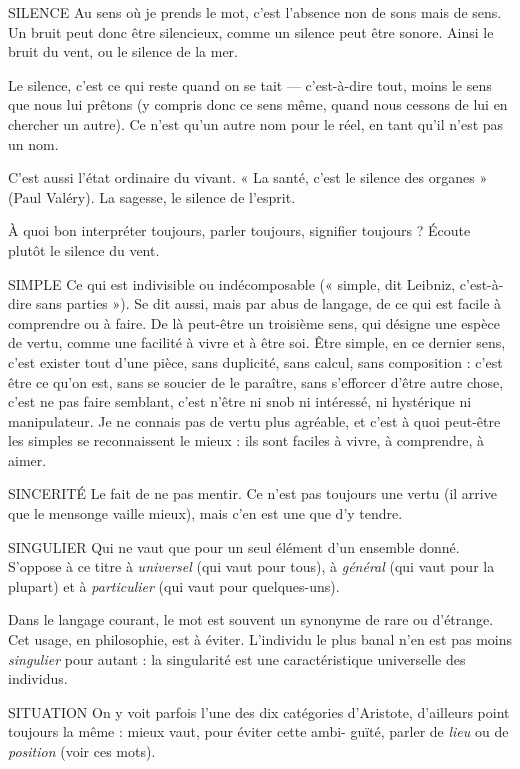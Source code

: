 SILENCE Au sens où je prends le mot, c’est l’absence non de sons mais de
sens. Un bruit peut donc être silencieux, comme un silence peut
être sonore. Ainsi le bruit du vent, ou le silence de la mer.

Le silence, c’est ce qui reste quand on se tait — c’est-à-dire tout, moins le
sens que nous lui prêtons (y compris donc ce sens même, quand nous cessons
de lui en chercher un autre). Ce n’est qu’un autre nom pour le réel, en tant
qu’il n’est pas un nom.

C'est aussi l’état ordinaire du vivant. « La santé, c’est le silence des
organes » (Paul Valéry). La sagesse, le silence de l'esprit.

À quoi bon interpréter toujours, parler toujours, signifier toujours ? Écoute
plutôt le silence du vent.

SIMPLE Ce qui est indivisible ou indécomposable (« simple, dit Leibniz,
c'est-à-dire sans parties »). Se dit aussi, mais par abus de langage, de
ce qui est facile à comprendre ou à faire. De là peut-être un troisième sens, qui
désigne une espèce de vertu, comme une facilité à vivre et à être soi. Être
simple, en ce dernier sens, c’est exister tout d’une pièce, sans duplicité, sans
calcul, sans composition : c’est être ce qu’on est, sans se soucier de le paraître,
sans s’efforcer d’être autre chose, c’est ne pas faire semblant, c’est n’être ni snob
ni intéressé, ni hystérique ni manipulateur. Je ne connais pas de vertu plus
agréable, et c’est à quoi peut-être les simples se reconnaissent le mieux : ils sont
faciles à vivre, à comprendre, à aimer.

SINCERITÉ Le fait de ne pas mentir. Ce n’est pas toujours une vertu (il
arrive que le mensonge vaille mieux), mais c’en est une que d’y
tendre.

SINGULIER Qui ne vaut que pour un seul élément d’un ensemble donné.
S’oppose à ce titre à {\it universel} (qui vaut pour tous), à {\it général}
(qui vaut pour la plupart) et à {\it particulier} (qui vaut pour quelques-uns).

Dans le langage courant, le mot est souvent un synonyme de rare ou
d’étrange. Cet usage, en philosophie, est à éviter. L’individu le plus banal n’en
est pas moins {\it singulier} pour autant : la singularité est une caractéristique universelle
des individus.

SITUATION On y voit parfois l’une des dix catégories d’Aristote, d’ailleurs
point toujours la même : mieux vaut, pour éviter cette ambi-
guïté, parler de {\it lieu} ou de {\it position} (voir ces mots).

